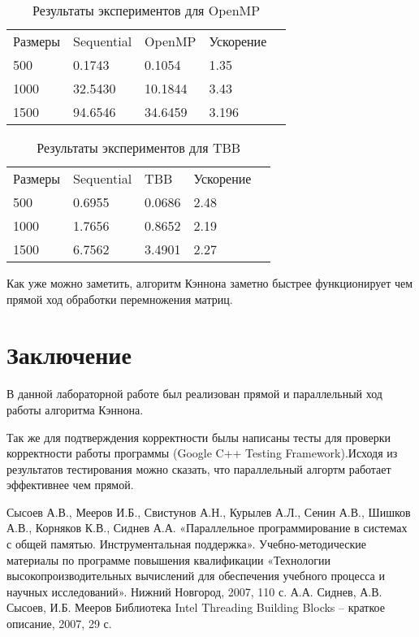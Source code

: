 \documentclass{report}
\begin{document}
\begin{table}[!h]
\caption{Результаты экспериментов для OpenMP}
\centering
\begin{tabular}{lllll}
Размеры & Sequential & OpenMP   & Ускорение  \\
500     & 0.1743     & 0.1054   & 1.35       \\
1000    & 32.5430    & 10.1844  & 3.43       \\
1500    & 94.6546   & 34.6459  & 3.196       \\
\end{tabular}
\end{table}

\begin{table}[!h]
\caption{Результаты экспериментов для TBB}
\centering
\begin{tabular}{lllll}
Размеры  & Sequential & TBB       & Ускорение     \\
500      & 0.6955     & 0.0686    & 2.48          \\
1000     & 1.7656     & 0.8652    & 2.19       \\
1500     & 6.7562     & 3.4901    & 2.27       \\
\end{tabular}
\end{table}

\par 
Как уже можно заметить, алгоритм Кэннона заметно быстрее функционирует чем прямой ход обработки перемножения матриц. 
\newpage

\section*{Заключение}
\par В данной лабораторной работе был реализован прямой и параллельный ход работы алгоритма Кэннона.

Так же для подтверждения корректности былы написаны тесты для проверки корректности работы программы (Google C++ Testing Framework).Исходя из результатов тестирования можно сказать, что параллельный алгортм работает эффективнее чем прямой. 
\newpage

\begin{thebibliography}{1}
 Сысоев А.В., Мееров И.Б., Свистунов А.Н., Курылев А.Л., Сенин А.В., Шишков А.В., Корняков К.В., Сиднев А.А. «Параллельное программирование в системах с общей памятью. Инструментальная поддержка». Учебно-методические материалы по программе повышения квалификации «Технологии высокопроизводительных вычислений для обеспечения учебного процесса и научных исследований». Нижний Новгород, 2007, 110 с.
 А.А. Сиднев, А.В. Сысоев, И.Б. Мееров Библиотека Intel Threading Building Blocks – краткое описание, 2007, 29 с.
\end{thebibliography}
\newpage
\end{document}

